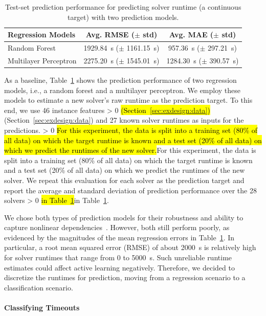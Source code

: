 \documentclass[sn-basic, Numbered]{sn-jnl} %
\newcommand{\showchanges}{1} %
\newcommand{\change}[1]{\ifnum \showchanges > 0 \sethlcolor{yellow}\hl{#1}\else#1\fi}
\begin{document}
\begin{table}[tb]
	\centering
	\caption{Test-set prediction performance for predicting solver runtime (a continuous target) with two prediction models.}
	\label{tab:regression}
	\begin{tabular}{lcc}
		\toprule
		{Regression Models} & {Avg. RMSE ($\pm$ std)} & {Avg. MAE ($\pm$ std)} \\
		\midrule
		Random Forest & \SI{1929.84}{s} ($\pm$ \SI{1161.15}{s}) & \phantom{0}\SI{957.36}{s} ($\pm$ \SI{297.21}{s}) \\[0.4ex]
		Multilayer Perceptron & \SI{2275.20}{s} ($\pm$ \SI{1545.01}{s}) & \SI{1284.30}{s} ($\pm$ \SI{390.57}{s}) \\
		\bottomrule
	\end{tabular}
\end{table}

As a baseline, Table~\ref{tab:regression} shows the prediction performance of two regression models, i.e., a random forest and a multilayer perceptron.
We employ these models to estimate a new solver's raw runtime as the prediction target.
To this end, we use 46 instance features \change{(Section~\ref{sec:exdesign:data})} and 27 known solver runtimes as inputs for the predictions.
\change{For this experiment, the data is split into a training set (80\% of all data) on which the target runtime is known and a test set (20\% of all data) on which we predict the runtimes of the new solver.}
We repeat this evaluation for each solver as the prediction target and report the average and standard deviation of prediction performance over the 28 solvers \change{in Table~\ref{tab:regression}}.

We chose both types of prediction models for their robustness and ability to capture nonlinear dependencies~\cite{breiman2001random}.
However, both still perform poorly, as evidenced by the magnitudes of the mean regression errors in Table~\ref{tab:regression}.
In particular, a root mean squared error (RMSE) of about \SI{2000}{s} is relatively high for solver runtimes that range from 0 to \SI{5000}{s}.
Such unreliable runtime estimates could affect active learning negatively.
Therefore, we decided to discretize the runtimes for prediction, moving from a regression scenario to a classification scenario.

\paragraph{Classifying Timeouts}
\end{document}
